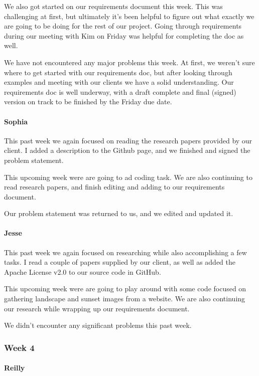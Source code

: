 \documentclass[onecolumn, draftclsnofoot,10pt, compsoc]{IEEEtran}
\begin{document}
\begin{flushleft}
We also got started on our requirements document this week. This was challenging at first, but ultimately it's been helpful to figure out what exactly we are going to be doing for the rest of our project. Going through requirements during our meeting with Kim on Friday was helpful for completing the doc as well.
 
 
We have not encountered any major problems this week. At first, we weren't sure where to get started with our requirements doc, but after looking through examples and meeting with our clients we have a solid understanding. Our requirements doc is well underway, with a draft complete and final (signed) version on track to be finished by the Friday due date.
 
\paragraph{Sophia}
 
This past week we again focused on reading the research papers provided by our client. I added a description to the Github page, and we finished and signed the problem statement.
 
 
This upcoming week were are going to ad coding task. We are also continuing to read research papers, and finish editing and adding to our requirements document.
 
 
Our problem statement was returned to us, and we edited and updated it.
 
\paragraph{Jesse}
 
This past week we again focused on researching while also accomplishing a few tasks. I read a couple of papers supplied by our client, as well as added the Apache License v2.0 to our source code in GitHub.
 
 
This upcoming week were are going to play around with some code focused on gathering landscape and sunset images from a website. We are also continuing our research while wrapping up our requirements document.
 
 
We didn't encounter any significant problems this past week.
 
\subsubsection{Week 4}
\paragraph{Reilly}
 

\end{flushleft}
\end{document}
